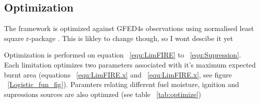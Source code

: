 \subsection{Optimization}
\begin{shaded}
The framework is optimized against GFED4s observations \citep{Giglio2013} using normalised least square r-package \citep{rstats}. This is likley to change though, so I wont descibe it yet 
\end{shaded}

Optimization is performed on equation ~\ref{equ:LimFIRE} to ~\ref{equ:Supression}. Each limitation optimizes two parameters associated with it's maximum expected burnt area (equations ~\ref{equ:LimFIRE.x} and ~\ref{equ:LimFIRE.x}, see figure ~\ref{Logistic_fun_fig}). Paramters relating different fuel moisture, ignition and supressions sources are also optimzed (see table ~\ref{tab:optimize})

